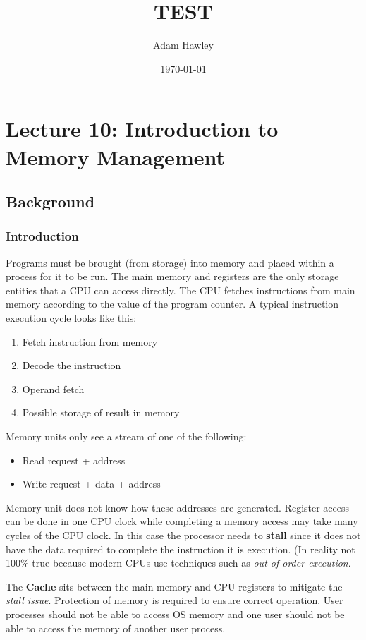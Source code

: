\documentclass{article}%
\author{Adam Hawley}
\date{\today}
\title{TEST}
\begin{document}
\tableofcontents

\maketitle
\section{Lecture 10: Introduction to Memory Management}


\subsection{Background}
\label{sec:orga76f10a}
\subsubsection{Introduction}
\label{sec:org78ddd86}
Programs must be brought (from storage) into memory and placed within a process for it to be run.
The main memory and registers are the only storage entities that a CPU can access directly.
The CPU fetches instructions from main memory according to the value of the program counter.
A typical instruction execution cycle looks like this:
\begin{enumerate}
\item Fetch instruction from memory
\item Decode the instruction
\item Operand fetch
\item Possible storage of result in memory
\end{enumerate}

Memory units only see a stream of one of the following:
\begin{itemize}
\item Read request + address
\item Write request + data + address
\end{itemize}
Memory unit does not know how these addresses are generated.
Register access can be done in one CPU clock while completing a memory access may take many cycles of the CPU clock.
In this case the processor needs to \textbf{stall} since it does not have the data required to complete the instruction it is execution.
(In reality not 100\% true because modern CPUs use techniques such as \emph{out-of-order execution}.

The \textbf{Cache} sits between the main memory and CPU registers to mitigate the \emph{stall issue}.
Protection of memory is required to ensure correct operation.
User processes should not be able to access OS memory and one user should not be able to access the memory of another user process.
\end{document}
